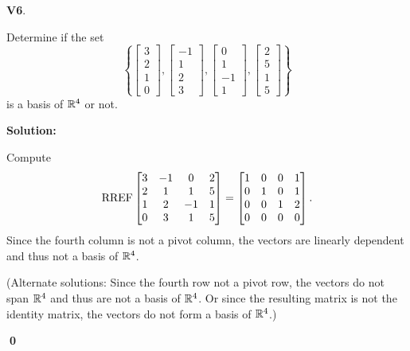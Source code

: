 \documentclass{article}
\newenvironment{problem}[1]
{
  \begin{flushleft}
  \textbf{#1}.
  \ignorespaces
}
{
  \end{flushleft}
}
\newenvironment{solution}
{
  \ignorespaces
  \textbf{Solution:}
}
{
  \ignorespacesafterend
  \begin{flushright}
  {\bfseries \qed}
  \end{flushright}
}
\begin{document}
\begin{problem}{V6}
Determine if the set \[ \left\{
 \begin{bmatrix} 3 \\ 2 \\ 1 \\ 0 \end{bmatrix} ,
 \begin{bmatrix} -1 \\ 1 \\ 2 \\ 3 \end{bmatrix} ,
 \begin{bmatrix} 0 \\ 1 \\ -1 \\ 1 \end{bmatrix} ,
 \begin{bmatrix} 2 \\ 5 \\ 1 \\ 5 \end{bmatrix} \right\} \]
is a basis of \(\mathbb{R}^4\) or not.
\end{problem}
\begin{solution}
Compute
\[\operatorname{RREF} \begin{bmatrix} 3 & -1 & 0 & 2 \\ 2 & 1 & 1 & 5 \\ 1 & 2 & -1 & 1 \\ 0 & 3 & 1 & 5 \end{bmatrix} =
\begin{bmatrix} 1 & 0 & 0 & 1 \\ 0 & 1 & 0 & 1 \\ 0 & 0 & 1 & 2 \\ 0 & 0 & 0 & 0 \end{bmatrix}.\]
Since the fourth column is not a pivot column, the vectors are linearly
dependent and thus not a basis of \(\mathbb{R}^4\).

(Alternate solutions:
Since the fourth row not a pivot row, the vectors do not span
\(\mathbb{R}^4\) and thus are not a basis of \(\mathbb{R}^4\). Or since the resulting matrix is not
the identity matrix, the vectors do not form a basis of \(\mathbb{R}^4\).)
\end{solution}
\end{document}
